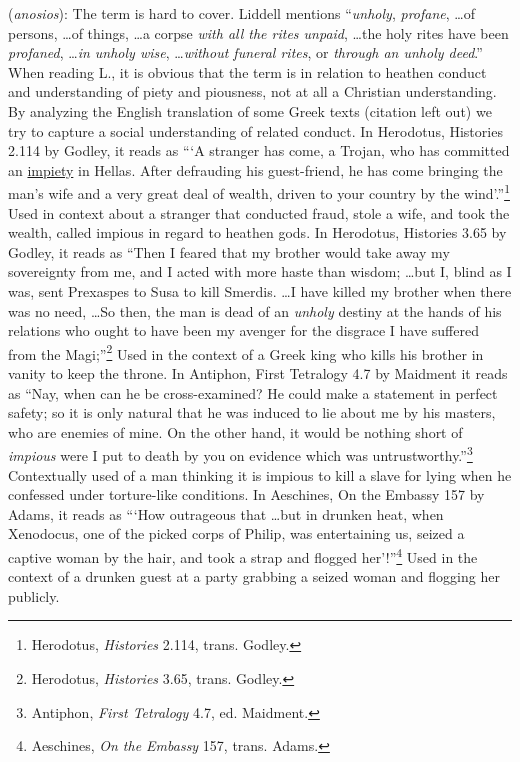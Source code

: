 \item[Impiously wicked,]

(\textit{anosios}):
The term is hard to cover. Liddell mentions  ``\emph{unholy}, \emph{profane}, \ldots of persons, \ldots of things, \ldots a corpse \emph{with all the rites unpaid}, \ldots the holy rites have been \emph{profaned}, \ldots \emph{in unholy wise}, \ldots \emph{without funeral rites}, or \emph{through an unholy deed}.'' When reading L., it is obvious that the term is in relation to heathen conduct and understanding of piety and piousness, not at all a Christian understanding. 
By analyzing the English translation of some Greek texts (citation left out) we try to capture a social understanding of related conduct.
In Herodotus, Histories 2.114 by Godley, it reads as ```A stranger has come, a Trojan, who has committed an \underline{impiety} in Hellas. After defrauding his guest-friend, he has come bringing the man's wife and a very great deal of wealth, driven to your country by the wind'.''\footnote{Herodotus, \emph{Histories} 2.114, trans. Godley.} Used in context about a stranger that conducted fraud, stole a wife, and took the wealth, called impious in regard to heathen gods.
In Herodotus, Histories 3.65 by Godley, it reads as ``Then I feared that my brother would take away my sovereignty from me, and I acted with more haste than wisdom; \ldots but I, blind as I was, sent Prexaspes to Susa to kill Smerdis. \ldots I have killed my brother when there was no need, \ldots So then, the man is dead of an \emph{unholy} destiny at the hands of his relations who ought to have been my avenger for the disgrace I have suffered from the Magi;''\footnote{Herodotus, \emph{Histories} 3.65, trans. Godley.} Used in the context of a Greek king who kills his brother in vanity to keep the throne.
In Antiphon, First Tetralogy 4.7 by Maidment it reads as ``Nay, when can he be cross-examined? He could make a statement in perfect safety; so it is only natural that he was induced to lie about me by his masters, who are enemies of mine. On the other hand, it would be nothing short of \emph{impious} were I put to death by you on evidence which was untrustworthy.''\footnote{Antiphon, \emph{First Tetralogy} 4.7, ed. Maidment.} Contextually used of a man thinking it is impious to kill a slave for lying when he confessed under torture-like conditions.
In Aeschines, On the Embassy 157 by Adams, it reads as ```How outrageous that \ldots but in drunken heat, when Xenodocus, one of the picked corps of Philip, was entertaining us, seized a captive woman by the hair, and took a strap and flogged her'!''\footnote{Aeschines, \emph{On the Embassy} 157, trans. Adams.} Used in the context of a drunken guest at a party grabbing a seized woman and flogging her publicly.
